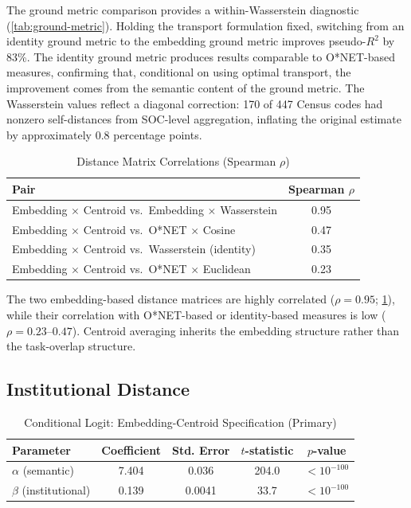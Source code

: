 \documentclass[12pt]{article}
\begin{document}
The ground metric comparison provides a within-Wasserstein diagnostic (\cref{tab:ground-metric}). Holding the transport formulation fixed, switching from an identity ground metric to the embedding ground metric improves pseudo-$R^2$ by 83\%. The identity ground metric produces results comparable to O*NET-based measures, confirming that, conditional on using optimal transport, the improvement comes from the semantic content of the ground metric. The Wasserstein values reflect a diagonal correction: 170 of 447 Census codes had nonzero self-distances from SOC-level aggregation, inflating the original estimate by approximately 0.8 percentage points.


\begin{table}[h!]
\centering
\caption{Distance Matrix Correlations (Spearman $\rho$)}
\label{tab:distance-correlations}
\begin{tabular}{lc}
\toprule
\textbf{Pair} & \textbf{Spearman $\rho$} \\
\midrule
Embedding $\times$ Centroid vs.\ Embedding $\times$ Wasserstein & 0.95 \\
Embedding $\times$ Centroid vs.\ O*NET $\times$ Cosine & 0.47 \\
Embedding $\times$ Centroid vs.\ Wasserstein (identity) & 0.35 \\
Embedding $\times$ Centroid vs.\ O*NET $\times$ Euclidean & 0.23 \\
\bottomrule
\end{tabular}
\end{table}


The two embedding-based distance matrices are highly correlated ($\rho = 0.95$; \cref{tab:distance-correlations}), while their correlation with O*NET-based or identity-based measures is low ($\rho = 0.23$--$0.47$). Centroid averaging inherits the embedding structure rather than the task-overlap structure.


\subsection{Institutional Distance}
\label{subsec:cps-mobility}


\begin{table}[h!]
\centering
\caption{Conditional Logit: Embedding-Centroid Specification (Primary)}
\label{tab:clogit-centroid}
\begin{tabular}{lcccc}
\toprule
\textbf{Parameter} & \textbf{Coefficient} & \textbf{Std. Error} & \textbf{$t$-statistic} & \textbf{$p$-value} \\
\midrule
$\alpha$ (semantic) & 7.404 & 0.036 & 204.0 & $< 10^{-100}$ \\
$\beta$ (institutional) & 0.139 & 0.0041 & 33.7 & $< 10^{-100}$ \\
\bottomrule
\end{tabular}
\end{table}
\end{document}
